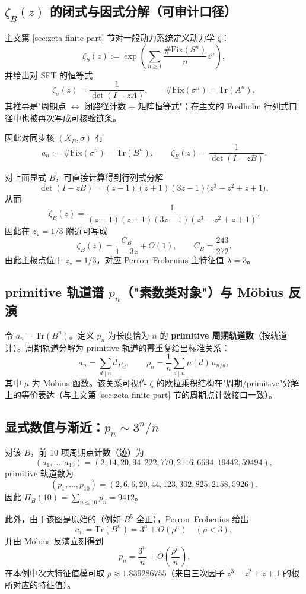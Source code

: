 \subsection{\texorpdfstring{$\zeta_B(z)$}{zeta\_B(z)} 的闭式与因式分解（可审计口径）}
主文第 \ref{sec:zeta-finite-part} 节对一般动力系统定义动力学 $\zeta$：
\[
\zeta_S(z):=\exp\!\left(\sum_{n\ge 1}\frac{\#\mathrm{Fix}(S^n)}{n}z^n\right),
\]
并给出对 SFT 的恒等式
\[
\zeta_\sigma(z)=\frac{1}{\det(I-zA)},\qquad
\#\mathrm{Fix}(\sigma^n)=\mathrm{Tr}(A^n),
\]
其推导是"周期点 $\leftrightarrow$ 闭路径计数 + 矩阵恒等式"；在主文的 Fredholm 行列式口径中也被再次写成可核验链条。

因此对同步核 $(X_B,\sigma)$ 有
\[
a_n:=\#\mathrm{Fix}(\sigma^n)=\mathrm{Tr}(B^n),\qquad
\zeta_B(z)=\frac{1}{\det(I-zB)}.
\]

对上面显式 $B$，可直接计算得到行列式分解
\[
\det(I-zB)=(z-1)(z+1)(3z-1)\bigl(z^3-z^2+z+1\bigr),
\]
从而
\[
\zeta_B(z)=\frac{1}{(z-1)(z+1)(3z-1)(z^3-z^2+z+1)}.
\]
因此在 $z_\star=1/3$ 附近可写成
\[
\zeta_B(z)=\frac{C_B}{1-3z}+O(1),
\qquad
C_B=\frac{243}{272}.
\]
由此主极点位于 $z_\star=1/3$，对应 Perron--Frobenius 主特征值 $\lambda=3$。

\subsection{primitive 轨道谱 \texorpdfstring{$p_n$}{p\_n}（"素数类对象"）与 Möbius 反演}
令 $a_n=\mathrm{Tr}(B^n)$。定义 $p_n$ 为长度恰为 $n$ 的 \textbf{primitive 周期轨道数}（按轨道计）。周期轨道分解为 primitive 轨道的幂重复给出标准关系：
\[
a_n=\sum_{d\mid n} d\,p_d,
\qquad
p_n=\frac{1}{n}\sum_{d\mid n}\mu(d)\,a_{n/d},
\]
其中 $\mu$ 为 Möbius 函数。该关系可视作 $\zeta$ 的欧拉乘积结构在"周期/primitive"分解上的等价表达（与主文第 \ref{sec:zeta-finite-part} 节的周期点计数接口一致）。

\subsection{显式数值与渐近：\texorpdfstring{$p_n\sim 3^n/n$}{p\_n ~ 3**n/n}}
对该 $B$，前 10 项周期点计数（迹）为
\[
(a_1,\dots,a_{10})=(2,14,20,94,222,770,2116,6694,19442,59494),
\]
primitive 轨道数为
\[
(p_1,\dots,p_{10})=(2,6,6,20,44,123,302,825,2158,5926).
\]
因此 $\Pi_B(10)=\sum_{n\le 10}p_n=9412$。

此外，由于该图是原始的（例如 $B^5$ 全正），Perron--Frobenius 给出
\[
a_n=\mathrm{Tr}(B^n)=3^n+O(\rho^n)
\quad(\rho<3),
\]
并由 Möbius 反演立刻得到
\[
p_n=\frac{3^n}{n}+O\!\left(\frac{\rho^n}{n}\right).
\]
在本例中次大特征值模可取 $\rho\approx 1.839286755$（来自三次因子 $z^3-z^2+z+1$ 的根所对应的特征值）。

